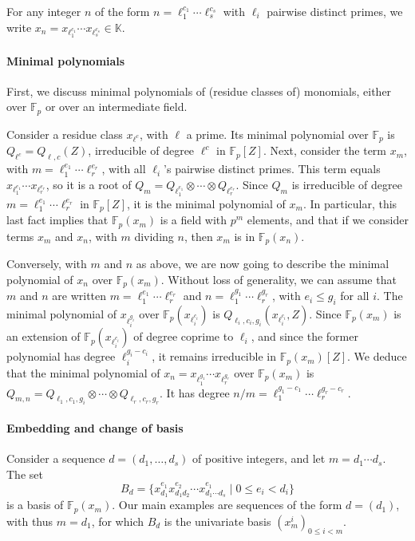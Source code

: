 \documentclass{sig-alternate}
\def\F {\ensuremath{\mathbb{F}}}
\def\K {\ensuremath{\mathbb{K}}}
\begin{document}
For any integer $n$ of the form $n=\ell_1^{c_1}\cdots \ell_s^{c_s}$
with $\ell_i$ pairwise distinct primes, we write $x_n =
x_{\ell_1^{c_1}} \cdots x_{\ell_s^{c_s}} \in \K$.

\paragraph*{{\bf \rm Minimal polynomials}}
First, we discuss minimal polynomials of (residue classes of)
monomials, either over $\F_p$ or over an intermediate field.

Consider a residue class $x_{\ell^{c}}$, with $\ell$ a prime. Its
minimal polynomial over $\F_p$ is $Q_{\ell^c}=Q_{\ell,c}(Z)$,
irreducible of degree $\ell^{c}$ in $\F_p[Z]$. Next, consider the term
$x_m$, with $m=\ell_1^{e_1}\cdots \ell_r^{e_r}$, with all $\ell_i$'s
pairwise distinct primes. This term equals $x_{\ell_1^{e_1}} \cdots
x_{\ell_r^{e_r}}$, so it is a root of $Q_{m}=Q_{\ell_1^{e_1}} \otimes
\cdots \otimes Q_{\ell_r^{e_r}}.$ Since $Q_m$ is irreducible of degree
$m=\ell_1^{e_1}\cdots \ell_r^{e_r}$ in $\F_p[Z]$, it is the minimal
polynomial of $x_m$.  In particular, this last fact implies that
$\F_p(x_m)$ is a field with $p^m$ elements, and that if we consider
terms $x_m$ and $x_n$, with $m$ dividing $n$, then $x_m$ is in
$\F_p(x_n)$.

Conversely, with $m$ and $n$ as above, we are now going to describe
the minimal polynomial of $x_n$ over $\F_p(x_m)$. Without loss of
generality, we can assume that $m$ and $n$ are written
$m=\ell_1^{e_1}\cdots \ell_r^{e_r}$ and
$n=\ell_1^{g_1}\cdots\ell_r^{g_r}$, with $e_i \le g_i$ for all $i$.
The minimal polynomial of $x_{\ell_i^{g_i}}$ over
$\F_p(x_{\ell_i^{c_i}})$ is $Q_{\ell_i,c_i,g_i}(x_{\ell_i^{c_i}},Z)$.
Since $\F_p(x_m)$ is an extension of $\F_p(x_{\ell_i^{c_i}})$ of
degree coprime to $\ell_i$, and since the former polynomial has degree
$\ell_i^{g_i-c_i}$, it remains irreducible in $\F_p(x_m)[Z]$. We
deduce that the minimal polynomial of $x_n = x_{\ell_1^{g_1}}\cdots
x_{\ell_r^{g_r}}$ over $\F_p(x_m)$ is $Q_{m,n}=Q_{\ell_1,c_1,g_i}
\otimes \cdots \otimes Q_{\ell_r,c_r,g_r}.$ It has degree
$n/m=\ell_1^{g_1-c_1}\cdots \ell_r^{g_r-c_r}$.

\paragraph*{\bf \rm {Embedding and change of basis}}
Consider a sequence $d=(d_1,\dots,d_s)$ of positive integers, and let
$m=d_1 \cdots d_s$. The set
$$B_d = \{ x_{d_1}^{e_1} x_{d_1 d_2}^{e_2} \cdots x_{d_1 \cdots
  d_s}^{e_1} \mid 0 \le e_i < d_i \}$$ is a basis of $\F_p(x_m)$. Our
main examples are sequences of the form $d=(d_1)$, with thus $m=d_1$,
for which $B_d$ is the univariate basis $(x_m^i)_{0 \le i < m}$.
\end{document}
